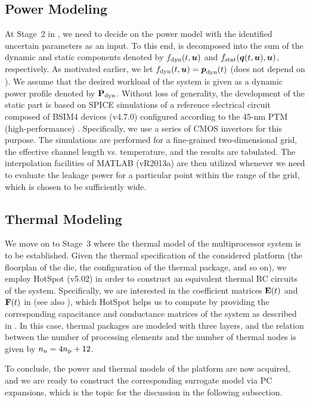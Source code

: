 \subsection{Power Modeling}

At Stage~2 in , we need to decide on the power model with the
identified uncertain parameters as an input. To this end,  is
decomposed into the sum of the dynamic and static components denoted by
$f_{\mathrm{dyn}}(t, \boldsymbol{u})$ and $f_{\mathrm{stat}}(\boldsymbol{q}(t, \boldsymbol{u}), \boldsymbol{u})$, respectively. As
motivated earlier, we let $f_{\mathrm{dyn}}(t, \boldsymbol{u}) = \boldsymbol{p}_{\mathrm{dyn}}(t)$ (does not
depend on \vu). We assume that the desired workload of the system is given as a
dynamic power profile denoted by $\mathbf{P}_{\mathrm{dyn}}$. Without loss of generality, the
development of the static part is based on SPICE simulations of a reference
electrical circuit composed of BSIM4 devices (v4.7.0) \cite{bsim} configured
according to the 45-nm PTM (high-performance) \cite{ptm}. Specifically, we use a
series of CMOS invertors for this purpose. The simulations are performed for a
fine-grained two-dimensional grid, the effective channel length vs. temperature,
and the results are tabulated. The interpolation facilities of MATLAB (vR2013a)
\cite{matlab} are then utilized whenever we need to evaluate the leakage power
for a particular point within the range of the grid, which is chosen to be
sufficiently wide.

\subsection{Thermal Modeling}

We move on to Stage~3 where the thermal model of the multiprocessor system is to
be established. Given the thermal specification \spec of the considered platform
(the floorplan of the die, the configuration of the thermal package, and so on),
we employ HotSpot (v5.02) \cite{skadron2004} in order to construct an equivalent
thermal RC circuits of the system. Specifically, we are interested in the
coefficient matrices $\mathbf{E}(t)$ and $\mathbf{F}(t)$ in  (see also
), which HotSpot helps us to compute by providing the
corresponding capacitance and conductance matrices of the system as described in
. In this case, thermal packages are modeled with three
layers, and the relation between the number of processing elements and the
number of thermal nodes is given by ${n_\mathrm{n}} = 4 {n_\mathrm{p}} + 12$.

To conclude, the power and thermal models of the platform are now acquired, and
we are ready to construct the corresponding surrogate model via PC expansions,
which is the topic for the discussion in the following subsection.

